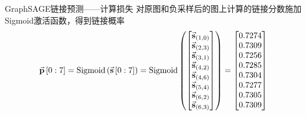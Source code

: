 \documentclass{beamer}
\begin{document}
\begin{frame}{GraphSAGE链接预测——计算损失}
	对原图和负采样后的图上计算的链接分数施加Sigmoid激活函数，得到链接概率
	\begin{equation}
		\setlength{\arraycolsep}{2pt}
		\vec{\textbf{p}}\left[0:7\right]=\text{Sigmoid}\left(\vec{\textbf{s}}\left[0:7\right]\right)=\text{Sigmoid}\left(\begin{bmatrix}
			\vec{\textbf{s}}_{\left(1,0\right)} \\
			\vec{\textbf{s}}_{\left(2,3\right)} \\
			\vec{\textbf{s}}_{\left(3,1\right)} \\
			\vec{\textbf{s}}_{\left(4,2\right)} \\
			\vec{\textbf{s}}_{\left(4,6\right)} \\
			\vec{\textbf{s}}_{\left(5,4\right)} \\
			\vec{\textbf{s}}_{\left(6,2\right)} \\
			\vec{\textbf{s}}_{\left(6,3\right)}             
		\end{bmatrix}\right)=\begin{bmatrix}             
			0.7274 \\
			0.7309 \\
			0.7256 \\
			0.7285 \\
			0.7304 \\
			0.7277 \\
			0.7305 \\
			0.7309
		\end{bmatrix}
	\end{equation}
\end{frame}
\end{document}
